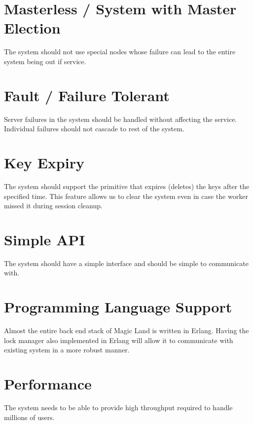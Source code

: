 \section{Masterless / System with Master Election}


The system should not use special nodes whose failure can lead to the
entire system being out if service.

\section{Fault / Failure Tolerant}


Server failures in the system should be handled without affecting the service.
Individual failures should not cascade to rest of the system.

\section{Key Expiry}


The system should support the primitive that expires (deletes) the keys after
the specified time. This feature allows us to clear the system even in case
the worker missed it during session cleanup.

\section{Simple API}


The system should have a simple interface and should be simple to communicate
with.

\section{Programming Language Support}


Almost the entire back end stack of Magic Land is written in Erlang. Having the
lock manager also implemented in Erlang will allow it to communicate with
existing system in a more robust manner.

\section{Performance}


The system needs to be able to provide high throughput required to handle
millions of users.

